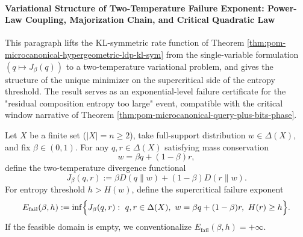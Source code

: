 
\paragraph{Variational Structure of Two-Temperature Failure Exponent: Power-Law Coupling, Majorization Chain, and Critical Quadratic Law}
This paragraph lifts the KL-symmetric rate function of Theorem \ref{thm:pom-microcanonical-hypergeometric-ldp-kl-sym}
from the single-variable formulation \((q\mapsto J_\beta(q))\) to a two-temperature variational problem, and gives the structure of the unique minimizer on the supercritical side of the entropy threshold.
The result serves as an exponential-level failure certificate for the "residual composition entropy too large" event, compatible with the critical window narrative of Theorem \ref{thm:pom-microcanonical-query-plus-bits-phase}.

\begin{definition}\label{def:pom-microcanonical-two-temperature-failure-exponent}
Let \(X\) be a finite set (\(|X|=n\ge 2\)), take full-support distribution \(w\in\Delta(X)\), and fix \(\beta\in(0,1)\).
For any \(q,r\in\Delta(X)\) satisfying mass conservation
\[
w=\beta q+(1-\beta)r,
\]
define the two-temperature divergence functional
\[
J_\beta(q,r):=\beta D(q\|w)+(1-\beta)D(r\|w).
\]
For entropy threshold \(h>H(w)\), define the supercritical failure exponent
\[
E_{\mathrm{fail}}(\beta,h)
:=
\inf\Bigl\{J_\beta(q,r):\ q,r\in\Delta(X),\ w=\beta q+(1-\beta)r,\ H(r)\ge h\Bigr\}.
\]
If the feasible domain is empty, we conventionalize \(E_{\mathrm{fail}}(\beta,h)=+\infty\).
\end{definition}

